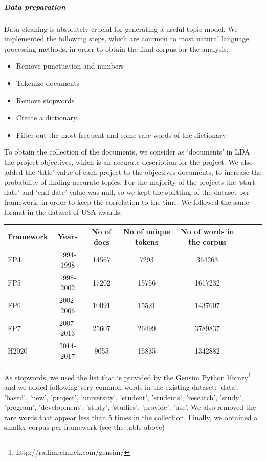 \documentclass[12pt]{report}
\begin{document}
\subparagraph{Data preparation}

Data cleaning is absolutely crucial for generating a useful topic model. We implemented the following steps, which are common to most natural language processing methods, in order to obtain the final corpus for the analysis:

\begin{itemize}
\item Remove punctuation and numbers
\item Tokenize documents
\item Remove stopwords
\item Create a dictionary
\item Filter out the most frequent and some rare words of the dictionary
\end{itemize}

To obtain the collection of the documents, we consider as ‘documents’ in LDA the project objectives, which is an accurate description for the project. We also added the ‘title’ value of each project to the objectives-documents, to increase the probability of finding accurate topics. For the majority of the projects the ‘start date’ and ‘end date’ value was null, so we kept the splitting of the dataset per framework, in order to keep the correlation to the time. We followed the same format in the dataset of USA awards.

\begin{center}
\begin{tabular}{l*{6}{c}r}
Framework & Years & No of docs & No of unique tokens & No of words in the corpus \\
\hline
FP4 & 1994-1998 & 14567 & 7293 & 364263 \\
FP5 & 1998-2002 & 17202 & 15756 & 1617232 \\
FP6 & 2002-2006 & 10091 & 15521 & 1437607 \\
FP7 & 2007-2013 & 25607 & 26499 & 3789837 \\
H2020 & 2014-2017 & 9055 & 15835 & 1342882 \\
\end{tabular}
\end{center}

As stopwords, we used the list that is provided by the Gensim Python library\footnote{http://radimrehurek.com/gensim/} and we added following very common words in the existing dataset: 'data', 'based', 'new', 'project', 'university', 'student', 'students', 'research', 'study', 'program', 'development', 'study', 'studies', 'provide', 'use'. We also removed the rare words that appear less than 5 times in the collection. Finally, we obtained a smaller corpus per framework (see the table above)
\end{document}
